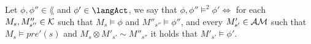 \begin{defn}
Let $\phi, \phi'' \in \lang$ and $\phi' \in \langAct$, we say that
$\phi, \phi'' \models^2 \phi' \iff$ for each $M_s, M''_{s''} \in \mathcal{K}$
such that $M_s \models \phi$ and $M''_{s''} \models \phi''$, and every $M'_{s'}
\in \mathcal{AM}$ such that $M_s \models pre'(s)$ and $M_s \otimes M'_{s'}
\sim M''_{s''}$ it holds that $M'_{s'} \models \phi'$.
\end{defn}


